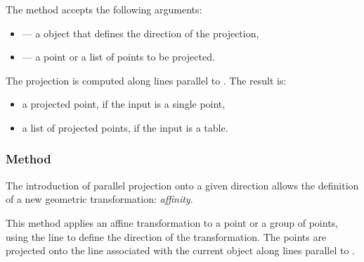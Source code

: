 \medskip

The method accepts the following arguments:
\begin{itemize}
  \item {} — a  object that defines the direction of the projection,
  \item {} — a point or a list of points to be projected.
\end{itemize}


The projection is computed along lines parallel to . The result is:
\begin{itemize}
  \item a projected point, if the input is a single point,
  \item a list of projected points, if the input is a table.
\end{itemize}

\vspace{1em}

\begin{tkzexample}[latex=.5\textwidth]
\begin{center}
\end{center}

\end{tkzexample}

\subsubsection{Method }
\label{ssub:method_line_affinity}

The introduction of parallel projection onto a given direction allows the definition of a new geometric transformation: \emph{affinity}.

\medskip

This method applies an affine transformation to a point or a group of points, using the line  to define the direction of the transformation. The points are projected onto the line associated with the current object along lines parallel to .

